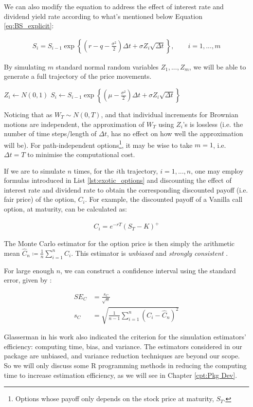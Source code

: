 We can also modify the equation to address the effect of interest rate and dividend yield rate according to what's mentioned below Equation \ref{eq:BS_explicit}:

\begin{align} \label{eq:mc_explicit_rq}
S_{i} = S_{i-1}\exp{\left\{(r-q-\frac{\sigma^2}{2})\Delta t+\sigma Z_i \sqrt{\Delta t}\right\}},\qquad i=1,...,m
\end{align}

By simulating $m$ standard normal random variables $Z_1,...,Z_m$, we will be able to generate a full trajectory of the price movements.

\begin{algorithmic}
	\State $Z_{i} \gets N(0,1)$
	\State $S_{i} \gets S_{i-1}\exp{\left\{(\mu-\frac{\sigma^2}{2})\Delta t+\sigma Z_i \sqrt{\Delta t}\right\}}$
\EndFor
\end{algorithmic}

Noticing that as $W_T\sim N(0,T)$, and that individual increments for Brownian motions are independent, the approximation of $W_T$ using $Z_i$'s is lossless (i.e. the number of time steps/length of $\Delta t$, has no effect on how well the approximation will be). For path-independent options\footnote{Options whose payoff only depends on the stock price at maturity, $S_T$.}, it may be wise to take $m=1$, i.e. $\Delta t=T$ to minimise the computational cost.

If we are to simulate $n$ times, for the $i$th trajectory, $i=1,...,n$, one may employ formulas introduced in List \ref{lst:exotic_options} and discounting the effect of interest rate and dividend rate to obtain the corresponding discounted payoff (i.e. fair price) of the option, $C_i$. For example, the discounted payoff of a Vanilla call option, at maturity, can be calculated as:

\begin{align} \label{eq:discount_vanilla_payoff}
C_i = e^{-rT}(S_T-K)^+
\end{align}

The Monte Carlo estimator for the option price is then simply the arithmetic mean $\hat{C}_n\coloneqq\frac{1}{n}\sum_{i=1}^{n}{C_i}$. This estimator is \textit{unbiased} and \textit{strongly consistent} \cite{Glasserman2003}.

For large enough $n$, we can construct a confidence interval using the standard error, given by \cite{Glasserman2003}:

\begin{align} \label{eq:mc_SE}
SE_C &= \frac{s_C}{\sqrt{n}} \\
 s_C &= \sqrt{\frac{1}{n-1}\sum_{i=1}^{n}{(C_i-\hat{C}_n)^2}}
\end{align}

Glasserman in his work \cite{Glasserman2003} also indicated the criterion for the simulation estimators' efficiency: computing time, bias, and variance. The estimators considered in our package are unbiased, and variance reduction techniques are beyond our scope. So we will only discuss some R programming methods in reducing the computing time to increase estimation efficiency, as we will see in Chapter \ref{cpt:Pkg Dev}.

\newpage